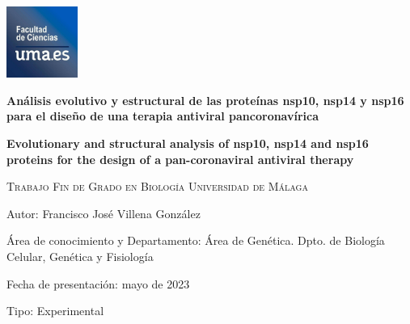 \begin{flushleft}
    \includegraphics[width=0.175\textwidth]{img/logo_uma.jpg}
\end{flushleft}

\vspace{1.5cm}

\begin{centering}

{\huge\bfseries Análisis evolutivo y estructural de las proteínas nsp10, nsp14 y nsp16 para el diseño de una terapia antiviral pancoronavírica \par}
\vspace{1.5cm}

{\huge\bfseries Evolutionary and structural analysis of nsp10, nsp14 and nsp16 proteins for the design of a pan-coronaviral antiviral therapy \par}
\vspace{2cm}

{\scshape\LARGE Trabajo Fin de Grado en Biología Universidad de Málaga \par}
\vspace{2cm}

\end{centering}

\begin{flushleft}

    Autor: Francisco José Villena González

    Área de conocimiento y Departamento: Área de Genética. Dpto. de Biología Celular, Genética y Fisiología

    Fecha de presentación: mayo de 2023
 
    Tipo: Experimental

\end{flushleft}
